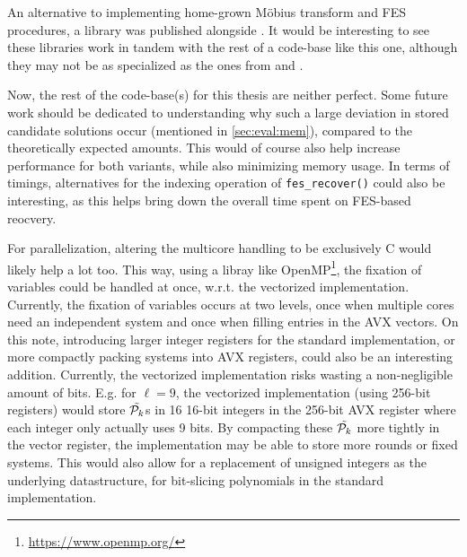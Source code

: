An alternative to implementing home-grown Möbius transform and FES procedures, a library was published alongside \cite{cryptoeprint:2022/1412}. It would be interesting to see these libraries work in tandem with the rest of a code-base like this one, although they may not be as specialized as the ones from \cite{ches-2010-23990} and \cite{cryptoeprint:2013/436}.

Now, the rest of the code-base(s) for this thesis are neither perfect. Some future work should be dedicated to understanding why such a large deviation in stored candidate solutions occur (mentioned in \cref{sec:eval:mem}), compared to the theoretically expected amounts. This would of course also help increase performance for both variants, while also minimizing memory usage. In terms of timings, alternatives for the indexing operation of \texttt{fes\_recover()} could also be interesting, as this helps bring down the overall time spent on FES-based reocvery. 

For parallelization, altering the multicore handling to be exclusively C would likely help a lot too. This way, using a libray like OpenMP\footnote{\url{https://www.openmp.org/}}, the fixation of variables could be handled at once, w.r.t. the vectorized implementation. Currently, the fixation of variables occurs at two levels, once when multiple cores need an independent system and once when filling entries in the AVX vectors. On this note, introducing larger integer registers for the standard implementation, or more compactly packing systems into AVX registers, could also be an interesting addition. Currently, the vectorized implementation risks wasting a non-negligible amount of bits. E.g. for $\ell = 9$, the vectorized implementation (using 256-bit registers) would store $\Tilde{\mathcal{P}_k}$s in 16 16-bit integers in the 256-bit AVX register where each integer only actually uses 9 bits. By compacting these $\Tilde{\mathcal{P}_k}$ more tightly in the vector register, the implementation may be able to store more rounds or fixed systems. This would also allow for a replacement of unsigned integers as the underlying datastructure, for bit-slicing polynomials in the standard implementation.